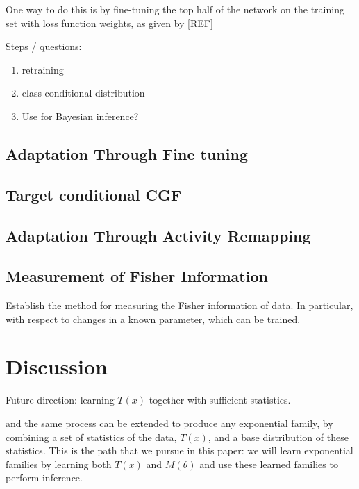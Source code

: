 \documentclass[10pt]{article}      %
\begin{document}
One way to do this is by fine-tuning the top half of the network on the training set with loss function weights, as given by [REF]



Steps / questions:
\begin{enumerate}
  \item retraining
  \item class conditional distribution
  \item Use for Bayesian inference?
\end{enumerate}



\subsection{Adaptation Through Fine tuning}





\subsection{Target conditional CGF}





\subsection{Adaptation Through Activity Remapping}






\subsection{Measurement of Fisher Information}

Establish the method for measuring the Fisher information of data. In particular, with respect to changes in a known parameter, which can be trained.




\section{Discussion}

Future direction: learning $T(x)$ together with sufficient statistics.


and the same process can be extended to produce any exponential family, by combining a set of statistics of the data, $T(x)$, and a base distribution of these statistics.
This is the path that we pursue in this paper: we will learn exponential families by learning both $T(x)$ and $M(\theta)$ and use these learned families to perform inference.
\end{document}
